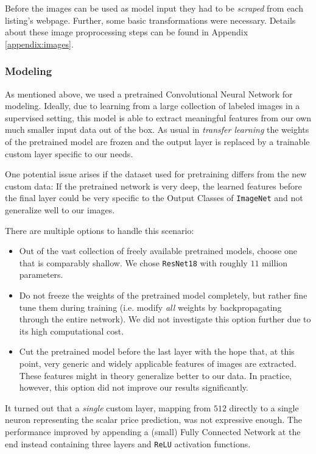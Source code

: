 \documentclass[12pt, letterpaper]{article}
\begin{document}
Before the images can be used as model input they had to be \emph{scraped} from each listing's webpage.
Further, some basic transformations were necessary.
Details about these image proprocessing steps can be found in Appendix \ref{appendix:images}.


\subsubsection{Modeling}

As mentioned above, we used a pretrained Convolutional Neural Network for modeling.
Ideally, due to learning from a large collection of labeled images in a supervised setting, this model is able to extract meaningful features from our own much smaller input data out of the box.
As usual in \emph{transfer learning} the weights of the pretrained model are frozen and the output layer is replaced by a trainable custom layer specific to our needs.

One potential issue arises if the dataset used for pretraining differs from the new custom data:
If the pretrained network is very deep, the learned features before the final layer could be very specific to the Output Classes of \texttt{ImageNet} and not generalize well to our images.

There are multiple options to handle this scenario:
\begin{itemize}
    \item Out of the vast collection of freely available pretrained models, choose one that is comparably shallow.
          We chose \texttt{ResNet18} with roughly $11$ million parameters.
    \item Do not freeze the weights of the pretrained model completely, but rather fine tune them during training (i.e. modify \emph{all} weights by backpropagating through the entire network).
          We did not investigate this option further due to its high computational cost.
    \item Cut the pretrained model before the last layer with the hope that, at this point, very generic and widely applicable features of images are extracted.
          These features might in theory generalize better to our data.
          In practice, however, this option did not improve our results significantly.
\end{itemize}

It turned out that a \emph{single} custom layer, mapping from $512$ directly to a single neuron representing the scalar price prediction, was not expressive enough.
The performance improved by appending a (small) Fully Connected Network at the end instead containing three layers and \texttt{ReLU} activation functions.
\end{document}
